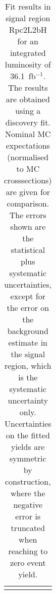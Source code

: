 \begin{table}
\begin{center}
{\begin{tabular*}{\textwidth}{@{\extracolsep{\fill}}lr}
\noalign{\smallskip}\hline\noalign{\smallskip}
\end{tabular*}
}
\end{center}
\caption{Fit results in signal region Rpc2L2bH for an integrated luminosity of 36.1~fb$^{-1}$.
The results are obtained using a discovery fit. Nominal MC expectations (normalised to MC crosssections) are given for comparison.
The errors shown are the statistical plus systematic uncertainties, except for the error on the background estimate in the signal region, which is the systematic uncertainty only.
Uncertainties on the fitted yields are symmetric by construction, where the negative error is truncated when reaching to zero event yield.
}
\label{table.results.systematics.in.logL.fit..Yields.Rpc2L2bH}
\end{table}
\clearpage
%